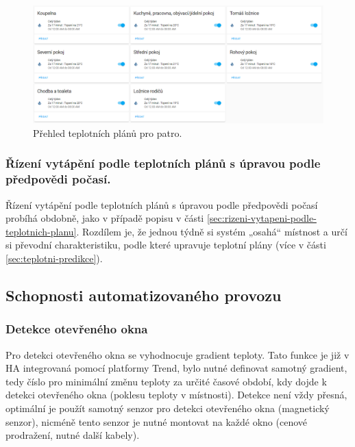 \begin{figure}[H]
    \centering
    \includegraphics[width=\textwidth]{images/software-ha/teplotni-plany-prehled-ha.png}
    \caption{Přehled teplotních plánů pro patro.}
    \label{fig:teplotni-plany-prehled-ha}
\end{figure}

\subsubsection{Řízení vytápění podle teplotních plánů s úpravou podle předpovědi počasí.} 
\label{sec:rizeni-vytapeni-podle-teplotnich-planu-s-upravou-podle-predpovedi-pocasi}
Řízení vytápění podle teplotních plánů s úpravou podle předpovědi počasí probíhá obdobně, jako v případě popisu v části \ref{sec:rizeni-vytapeni-podle-teplotnich-planu}. Rozdílem je, že jednou týdně si systém „osahá“ místnost a určí si převodní charakteristiku, podle které  upravuje teplotní plány (více v části \ref{sec:teplotni-predikce}).

\subsection{Schopnosti automatizovaného provozu}
\subsubsection{Detekce otevřeného okna}
\label{sec:detekce-otevreneho-okna}
Pro detekci otevřeného okna se vyhodnocuje gradient teploty. Tato funkce je již v HA integrovaná pomocí platformy Trend, bylo nutné definovat samotný gradient, tedy číslo pro minimální změnu teploty za určité časové období, kdy dojde k detekci otevřeného okna (poklesu teploty v místnosti). Detekce není vždy přesná, optimální je použít samotný senzor pro detekci otevřeného okna (magnetický senzor), nicméně tento senzor je nutné montovat na každé okno (cenové prodražení, nutné další kabely).

